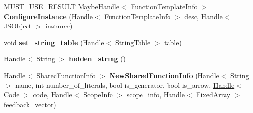 \begin{DoxyCompactItemize}
\item 
\hypertarget{classv8_1_1internal_1_1_v8___f_i_n_a_l_a474de0c824cd753893b5001e74ad340d}{}M\+U\+S\+T\+\_\+\+U\+S\+E\+\_\+\+R\+E\+S\+U\+L\+T \hyperlink{classv8_1_1internal_1_1_maybe_handle}{Maybe\+Handle}$<$ \hyperlink{classv8_1_1internal_1_1_function_template_info}{Function\+Template\+Info} $>$ {\bfseries Configure\+Instance} (\hyperlink{classv8_1_1internal_1_1_handle}{Handle}$<$ \hyperlink{classv8_1_1internal_1_1_function_template_info}{Function\+Template\+Info} $>$ desc, \hyperlink{classv8_1_1internal_1_1_handle}{Handle}$<$ \hyperlink{classv8_1_1internal_1_1_j_s_object}{J\+S\+Object} $>$ instance)\label{classv8_1_1internal_1_1_v8___f_i_n_a_l_a474de0c824cd753893b5001e74ad340d}

\item 
\hypertarget{classv8_1_1internal_1_1_v8___f_i_n_a_l_a6a4516fced01024bffe2a945ca442838}{}void {\bfseries set\+\_\+string\+\_\+table} (\hyperlink{classv8_1_1internal_1_1_handle}{Handle}$<$ \hyperlink{classv8_1_1internal_1_1_string_table}{String\+Table} $>$ table)\label{classv8_1_1internal_1_1_v8___f_i_n_a_l_a6a4516fced01024bffe2a945ca442838}

\item 
\hypertarget{classv8_1_1internal_1_1_v8___f_i_n_a_l_a98eaf252f2b9e5c85a39b12a348c9d9f}{}\hyperlink{classv8_1_1internal_1_1_handle}{Handle}$<$ \hyperlink{classv8_1_1internal_1_1_string}{String} $>$ {\bfseries hidden\+\_\+string} ()\label{classv8_1_1internal_1_1_v8___f_i_n_a_l_a98eaf252f2b9e5c85a39b12a348c9d9f}

\item 
\hypertarget{classv8_1_1internal_1_1_v8___f_i_n_a_l_acd634c824fd2a962f01c8d74988e2448}{}\hyperlink{classv8_1_1internal_1_1_handle}{Handle}$<$ \hyperlink{classv8_1_1internal_1_1_shared_function_info}{Shared\+Function\+Info} $>$ {\bfseries New\+Shared\+Function\+Info} (\hyperlink{classv8_1_1internal_1_1_handle}{Handle}$<$ \hyperlink{classv8_1_1internal_1_1_string}{String} $>$ name, int number\+\_\+of\+\_\+literals, bool is\+\_\+generator, bool is\+\_\+arrow, \hyperlink{classv8_1_1internal_1_1_handle}{Handle}$<$ \hyperlink{classv8_1_1internal_1_1_code}{Code} $>$ code, \hyperlink{classv8_1_1internal_1_1_handle}{Handle}$<$ \hyperlink{classv8_1_1internal_1_1_scope_info}{Scope\+Info} $>$ scope\+\_\+info, \hyperlink{classv8_1_1internal_1_1_handle}{Handle}$<$ \hyperlink{classv8_1_1internal_1_1_fixed_array}{Fixed\+Array} $>$ feedback\+\_\+vector)\label{classv8_1_1internal_1_1_v8___f_i_n_a_l_acd634c824fd2a962f01c8d74988e2448}


\end{DoxyCompactItemize}
